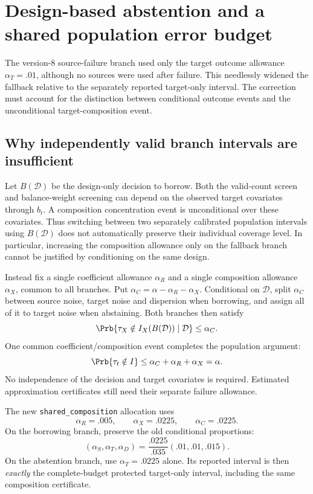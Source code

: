\section{Design-based abstention and a shared population error budget}
\label{sec:design-budget}

The version-8 source-failure branch used only the target outcome allowance
$\alpha_T=.01$, although no sources were used after failure. This needlessly
widened the fallback relative to the separately reported target-only interval.
The correction must account for the distinction between conditional outcome
events and the unconditional target-composition event.

\subsection{Why independently valid branch intervals are insufficient}

Let $B(\mathcal D)$ be the design-only decision to borrow. Both the valid-count
screen and balance-weight screening can depend on the observed target
covariates through $b_t$. A composition concentration event is unconditional
over these covariates. Thus switching between two separately calibrated
population intervals using $B(\mathcal D)$ does not automatically preserve
their individual coverage level. In particular, increasing the composition
allowance only on the fallback branch cannot be justified by conditioning on
the same design.

Instead fix a single coefficient allowance $\alpha_R$ and a single composition
allowance $\alpha_X$, common to all branches. Put
$\alpha_C=\alpha-\alpha_R-\alpha_X$. Conditional on $\mathcal D$, split
$\alpha_C$ between source noise, target noise and dispersion when borrowing,
and assign all of it to target noise when abstaining. Both branches then
satisfy
\[
 \Prb\{\tau_X\notin I_X(B(\mathcal D))\mid\mathcal D\}\le\alpha_C.
\]
One common coefficient/composition event completes the population argument:
\[
 \Prb\{\tau_t\notin I\}\le\alpha_C+\alpha_R+\alpha_X=\alpha.
\]
No independence of the decision and target covariates is required. Estimated
approximation certificates still need their separate failure allowance.

The new \texttt{shared\_composition} allocation uses
\[
 \alpha_R=.005,\qquad\alpha_X=.0225,\qquad\alpha_C=.0225.
\]
On the borrowing branch, preserve the old conditional proportions:
\[
 (\alpha_S,\alpha_T,\alpha_D)
   =\frac{.0225}{.035}(.01,.01,.015).
\]
On the abstention branch, use $\alpha_T=.0225$ alone. Its reported interval
is then \emph{exactly} the complete-budget protected target-only interval,
including the same composition certificate.

